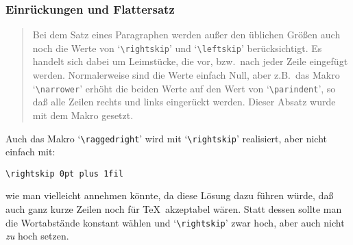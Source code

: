 \subsubsection{Einr\"uckungen und Flattersatz}
\begin{quote}
Bei dem Satz eines Paragraphen werden au\ss{}er den \"ublichen
Gr\"o\ss{}en auch noch die Werte von 
`\verb|\rightskip|' und
`\verb|\leftskip|' ber\"ucksichtigt. Es handelt sich dabei um
Leimst\"ucke, die vor, bzw.\ nach jeder Zeile eingef\"ugt werden.
Normalerweise sind die Werte einfach Null, aber z.B.\ das Makro
`\verb|\narrower|' erh\"oht die beiden Werte auf den Wert von
`\verb|\parindent|', so da\ss{} alle Zeilen rechts und links einger\"uckt
werden. Dieser Absatz wurde mit dem Makro gesetzt.
\end{quote}

{\raggedright Auch das Makro `\verb|\raggedright|' wird mit
`\verb|\rightskip|' realisiert, aber nicht einfach mit:}
\begin{verbatim}
\rightskip 0pt plus 1fil
\end{verbatim}
{\raggedright wie man vielleicht annehmen k\"onnte, da diese L\"osung dazu
f\"uhren w\"urde, da\ss{} auch ganz kurze Zeilen noch f\"ur \TeX\ akzeptabel
w\"aren. Statt dessen sollte man die Wortabst\"ande konstant w\"ahlen und
`\verb|\rightskip|' zwar hoch, aber auch nicht {\em zu} hoch setzen.}

